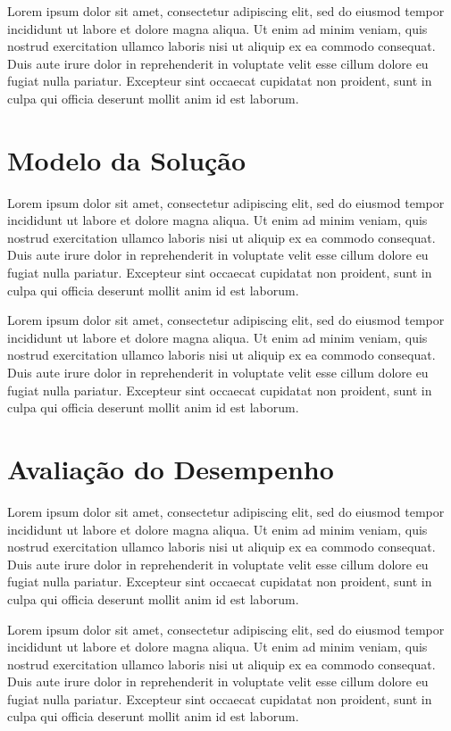 \documentclass{acm_proc_article-sp}
\begin{document}
	Lorem ipsum dolor sit amet, consectetur adipiscing elit, sed do 
	eiusmod tempor incididunt ut labore et dolore magna aliqua. Ut 
	enim ad minim veniam, quis nostrud exercitation ullamco laboris 
	nisi ut aliquip ex ea commodo consequat. Duis aute irure dolor in 
	reprehenderit in voluptate velit esse cillum dolore eu fugiat 
	nulla pariatur. Excepteur sint occaecat cupidatat non proident, 
	sunt in culpa qui officia deserunt mollit anim id est laborum.

\section{Modelo da Solução}

	Lorem ipsum dolor sit amet, consectetur adipiscing elit, sed do 
	eiusmod tempor incididunt ut labore et dolore magna aliqua. Ut 
	enim ad minim veniam, quis nostrud exercitation ullamco laboris 
	nisi ut aliquip ex ea commodo consequat. Duis aute irure dolor in 
	reprehenderit in voluptate velit esse cillum dolore eu fugiat 
	nulla pariatur. Excepteur sint occaecat cupidatat non proident, 
	sunt in culpa qui officia deserunt mollit anim id est laborum.

	Lorem ipsum dolor sit amet, consectetur adipiscing elit, sed do 
	eiusmod tempor incididunt ut labore et dolore magna aliqua. Ut 
	enim ad minim veniam, quis nostrud exercitation ullamco laboris 
	nisi ut aliquip ex ea commodo consequat. Duis aute irure dolor in 
	reprehenderit in voluptate velit esse cillum dolore eu fugiat 
	nulla pariatur. Excepteur sint occaecat cupidatat non proident, 
	sunt in culpa qui officia deserunt mollit anim id est laborum.

\section{Avaliação do Desempenho}

	Lorem ipsum dolor sit amet, consectetur adipiscing elit, sed do 
	eiusmod tempor incididunt ut labore et dolore magna aliqua. Ut 
	enim ad minim veniam, quis nostrud exercitation ullamco laboris 
	nisi ut aliquip ex ea commodo consequat. Duis aute irure dolor in 
	reprehenderit in voluptate velit esse cillum dolore eu fugiat 
	nulla pariatur. Excepteur sint occaecat cupidatat non proident, 
	sunt in culpa qui officia deserunt mollit anim id est laborum.

	Lorem ipsum dolor sit amet, consectetur adipiscing elit, sed do 
	eiusmod tempor incididunt ut labore et dolore magna aliqua. Ut 
	enim ad minim veniam, quis nostrud exercitation ullamco laboris 
	nisi ut aliquip ex ea commodo consequat. Duis aute irure dolor in 
	reprehenderit in voluptate velit esse cillum dolore eu fugiat 
	nulla pariatur. Excepteur sint occaecat cupidatat non proident, 
	sunt in culpa qui officia deserunt mollit anim id est laborum.
\end{document}
